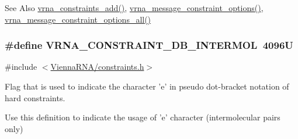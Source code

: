 \begin{DoxySeeAlso}{See Also}
\hyperlink{group__constraints_ga35a401f680969a556858a8dd5f1d07cc}{vrna\-\_\-constraints\-\_\-add()}, \hyperlink{group__constraints_gaa1f20b53bf09ac2e6b0dbb13f7d89670}{vrna\-\_\-message\-\_\-constraint\-\_\-options()}, \hyperlink{group__constraints_gaec7e13fa0465c2acc7a621d1aecb709f}{vrna\-\_\-message\-\_\-constraint\-\_\-options\-\_\-all()} 
\end{DoxySeeAlso}
\hypertarget{group__constraints_ga31d0ebb9755ca8a4acafc14f00ca755d}{
\subsubsection[{V\-R\-N\-A\-\_\-\-C\-O\-N\-S\-T\-R\-A\-I\-N\-T\-\_\-\-D\-B\-\_\-\-I\-N\-T\-E\-R\-M\-O\-L}]{\setlength{\rightskip}{0pt plus 5cm}\#define V\-R\-N\-A\-\_\-\-C\-O\-N\-S\-T\-R\-A\-I\-N\-T\-\_\-\-D\-B\-\_\-\-I\-N\-T\-E\-R\-M\-O\-L~4096\-U}}\label{group__constraints_ga31d0ebb9755ca8a4acafc14f00ca755d}


{\ttfamily \#include $<$\hyperlink{constraints_8h}{Vienna\-R\-N\-A/constraints.\-h}$>$}



Flag that is used to indicate the character 'e' in pseudo dot-\/bracket notation of hard constraints. 

Use this definition to indicate the usage of 'e' character (intermolecular pairs only)

